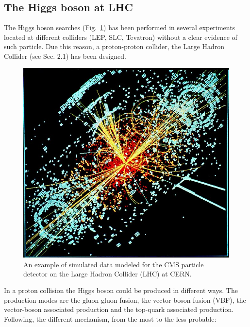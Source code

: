\subsection*{The Higgs boson at LHC}
The Higgs boson  searches (Fig.~\ref{650px-CMS_Higgs-event}) has been performed in several experiments located  at different  colliders (LEP, SLC, Tevatron) without a clear evidence of such particle.
Due  this reason, a proton-proton collider, the Large Hadron Collider (see Sec. 2.1) has been designed. 
\begin{figure}
\centering
\includegraphics[scale= 0.3]{../Cap1/650px-CMS_Higgs-event}
\caption{An example of simulated data modeled for the CMS particle detector on the Large Hadron Collider (LHC) at CERN.}
\label{650px-CMS_Higgs-event}
\end{figure}  
In a proton collision the Higgs boson could be produced in different ways. The production modes are the gluon gluon fusion, the vector boson fusion (VBF), the vector-boson associated production and the top-quark associated production. Following, the different mechanism, from the most to the less probable:
